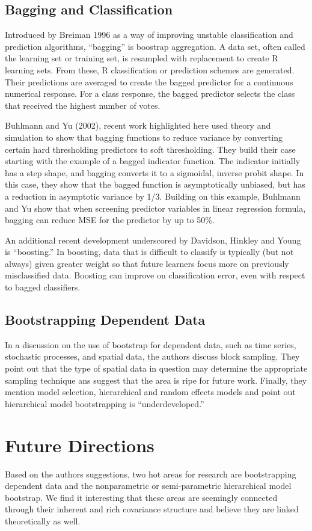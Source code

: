 \documentclass[11pt]{article}
\begin{document}
\subsection{Bagging and Classification}
\label{sec-1-8}


Introduced by Breiman 1996 as a way of improving unstable classification and
prediction algorithms, ``bagging'' is boostrap aggregation. A data set,
often called the learning set or training set, is resampled with
replacement to create R learning sets. From these, R classification or
prediction schemes are generated. Their predictions are averaged to
create the bagged predictor for a continuous numerical response. For
a class response, the bagged predictor selects the class that
received the highest number of votes.

Buhlmann and Yu (2002), recent work highlighted here used theory and 
simulation to show that bagging functions to reduce variance by
converting certain hard thresholding predictors to soft thresholding.
They build their case starting with the example of a bagged indicator
function. The indicator initially has a step shape, and bagging
converts it to a sigmoidal, inverse probit shape. In this case, they
show that the bagged function is asymptotically unbiased, but has a
reduction in asymptotic variance by 1/3. Building on this example,
Buhlmann and Yu show that when screening predictor variables in
linear regression formula, bagging can reduce MSE for the predictor
by up to 50\%.

An additional recent development underscored by Davidson, Hinkley and
Young is ``boosting.'' In boosting, data that is difficult to classify
is typically (but not always) given greater weight so that future
learners focus more on previously misclassified data. Boosting can
improve on classification error, even with respect to bagged classifiers.
\subsection{Bootstrapping Dependent Data}
\label{sec-1-9}


In a discussion on the use of bootstrap for dependent data,
such as time series, stochastic processes, and spatial data, the 
authors discuss block sampling. They point out that the type of
spatial data in question may determine the appropriate sampling 
technique ans suggest that the area is ripe for future work. Finally,
they mention model selection, hierarchical and random effects models
and point out hierarchical model bootstrapping is ``underdeveloped.''
\section{Future Directions}
\label{sec-2}

  
  Based on the authors suggestions, two hot areas for research are
  bootstrapping dependent data and the nonparametric or
  semi-parametric hierarchical model bootstrap. We find it
  interesting that these areas are seemingly connected through their 
  inherent and rich covariance structure and believe they are linked
  theoretically as well.
\end{document}
